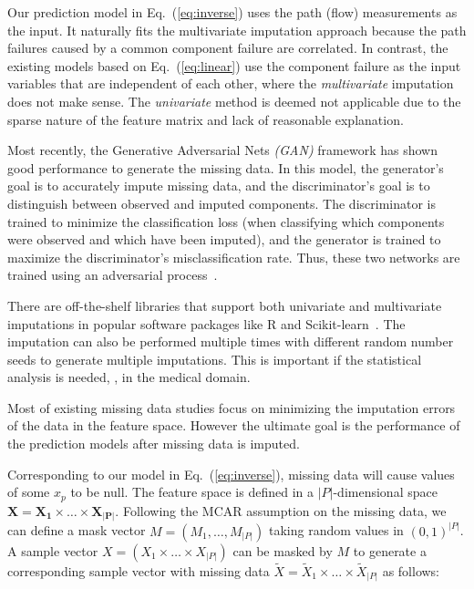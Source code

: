 Our prediction model in Eq.~(\ref{eq:inverse})  uses the path (flow) measurements as the input. It naturally fits the multivariate imputation approach 
because the path failures caused by a common component failure are correlated. In contrast, the existing models based on Eq.~(\ref{eq:linear}) use the 
component failure as the input variables that are independent of each other, where the {\it multivariate} imputation does not make sense.
The {\it univariate} method is deemed not applicable due to the sparse nature of the feature matrix and lack of reasonable explanation.

Most recently,  the Generative Adversarial Nets {\it (GAN)} framework has shown good performance to generate the missing data.
In this model, the generator’s goal is to accurately impute missing data, and the discriminator’s goal is to distinguish between observed and imputed 
components. The discriminator is trained to minimize the classification loss (when classifying which components were observed and 
which have been imputed), and the generator is trained to maximize the discriminator’s misclassification rate. Thus, these 
two networks are trained using an adversarial process~\cite{Yoon2018GAINMD,Awan2021ImputationOM}.

There are off-the-shelf libraries that support both univariate and multivariate imputations in popular software packages like R and 
Scikit-learn~\cite{JSSv045i03,10.1371/journal.pone.0254720}. The imputation can also be performed multiple times with different 
random number seeds to generate multiple imputations. This is important if the statistical analysis is needed, \eg, in the medical domain. 

Most of existing missing data studies focus on minimizing the imputation errors of the data in the feature space. However the ultimate goal 
is the performance of the prediction models after missing data is imputed.

Corresponding to our model in Eq.~(\ref{eq:inverse}), missing data will cause values of some $x_p$ to be null. 
The feature space is defined in a $|P|$-dimensional space $\mathbf{X} = \mathbf{X_1} \times \ldots \times \mathbf{X_{|P|}}$. 
Following the MCAR assumption 
on the missing data, we can define a mask vector $M = (M_1, \ldots, M_{|P|})$ taking random values in ${(0, 1)}^{|P|}$.  
A sample vector $X = (X_1 \times \ldots \times X_{|P|})$ 
can be masked by $M$ to generate a corresponding sample vector with missing data $\tilde{X} = \tilde{X}_1 \times \ldots \times \tilde{X}_{|P|}$ as follows:

